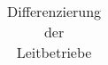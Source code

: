 \begin{table}[ht]
  \centering
  \caption{Differenzierung der Leitbetriebe}
  \label{table:Differenzierung}
  \begin{tabular}{|l|l|}
    \hline
			


  \end{tabular}
\end{table}
